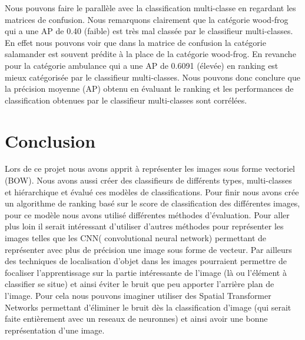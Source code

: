 \documentclass[a4paper,11pt]{report}
\begin{document}
Nous pouvons faire le parallèle avec la classification multi-classe en regardant les matrices de confusion. Nous remarquons clairement que la catégorie wood-frog qui a une AP de 0.40 (faible) est très mal classée par le classifieur multi-classes. En effet nous pouvons voir que dans la matrice de confusion la catégorie salamander est souvent prédite à la place de la catégorie wood-frog. En revanche pour la catégorie ambulance qui a une AP de 0.6091 (élevée) en ranking est mieux catégorisée par le classifieur multi-classes. Nous pouvons donc conclure que la précision moyenne (AP) obtenu en évaluant le ranking et les performances de classification obtenues par le classifieur multi-classes sont corrélées. 


\chapter*{Conclusion}
Lors de ce projet nous avons apprit à représenter les images sous forme vectoriel (BOW). Nous avons aussi créer des classifieurs de différents types, multi-classes et hiérarchique et évalué ces modèles de classifications. Pour finir nous avons crée un algorithme de ranking basé sur le score de classification des différentes images, pour ce modèle nous avons utilisé différentes méthodes d'évaluation. Pour aller plus loin il serait intéressant d'utiliser d'autres méthodes pour représenter les images telles que les CNN( convolutional neural network) permettant de représenter avec plus de précision une image sous forme de vecteur. Par ailleurs des techniques de localisation d'objet dans les images pourraient permettre de focaliser l'apprentissage sur la partie intéressante de l'image (là ou l'élément à classifier se situe) et ainsi éviter le bruit que peu apporter l'arrière plan de l'image. Pour cela nous pouvons imaginer utiliser des Spatial Transformer Networks permettant d'éliminer le bruit dès la classification d'image (qui serait faite entièrement avec un reseaux de neuronnes) et ainsi avoir une bonne représentation d'une image.









\end{document}
